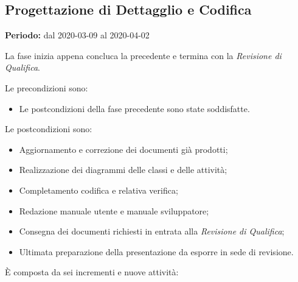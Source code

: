 \subsection{Progettazione di Dettagglio e Codifica}
\label{progettazione_di_dettaglio}
\textbf{Periodo:} dal 2020-03-09 al 2020-04-02 

La fase inizia appena concluca la precedente e termina con la \textit{Revisione di Qualifica}. 

Le precondizioni sono:
\begin{itemize}
    \item Le postcondizioni della fase precedente sono state soddisfatte.
\end{itemize}

Le postcondizioni sono:
\begin{itemize}
    \item Aggiornamento e correzione dei documenti già prodotti;
    \item Realizzazione dei diagrammi delle classi e delle attività;
    \item Completamento codifica e relativa verifica;
    \item Redazione manuale utente e manuale sviluppatore;
    \item Consegna dei documenti richiesti in entrata alla \textit{Revisione di Qualifica};
    \item Ultimata preparazione della presentazione da esporre in sede di revisione.
\end{itemize}

È composta da sei incrementi e nuove attività:

